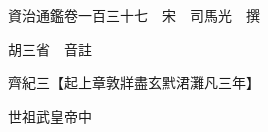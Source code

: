 










 


 
 


 

  
  
  
  
  





  
  
  
  
  
 
  

  

  
  
  



  

 
 

  
   




  

  
  


  　　資治通鑑卷一百三十七　宋　司馬光　撰

　　胡三省　音註

　　齊紀三【起上章敦牂盡玄黓涒灘凡三年】

　　世祖武皇帝中

